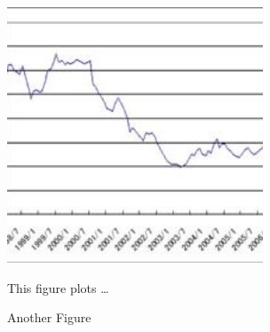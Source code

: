 \begin{figure}[H]
    \begin{center}
    \caption{Another Figure}
    \includegraphics[width=3.0in]{fig/dummy_figure.jpg}
    \end{center}
	\label{fig:mainsummary}
    \vspace{0.2cm}
    \begin{minipage}{0.95\textwidth} 
	{\footnotesize This figure plots \ldots
	\par
	}
	\end{minipage}
\end{figure}
